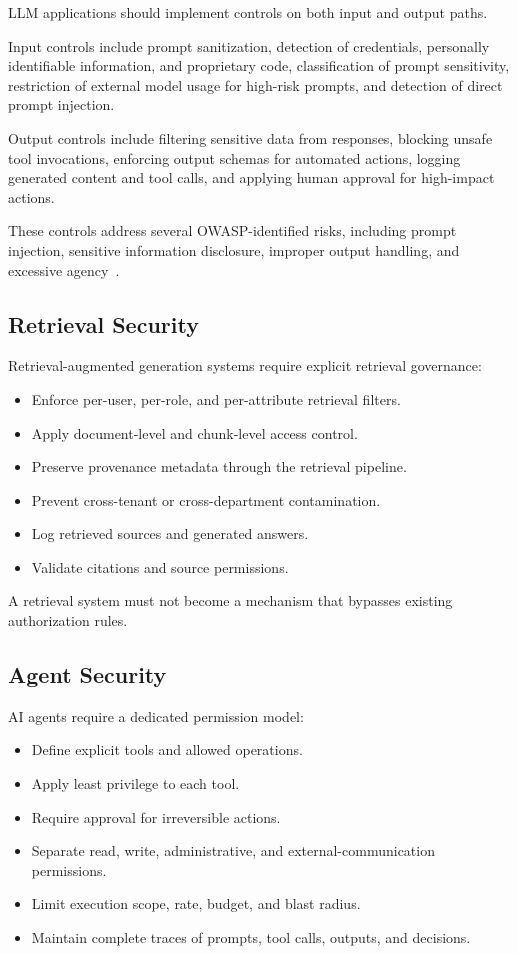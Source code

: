 \documentclass[conference]{IEEEtran}
\begin{document}
LLM applications should implement controls on both input and output paths.

Input controls include prompt sanitization, detection of credentials, personally identifiable information, and proprietary code, classification of prompt sensitivity, restriction of external model usage for high-risk prompts, and detection of direct prompt injection.

Output controls include filtering sensitive data from responses, blocking unsafe tool invocations, enforcing output schemas for automated actions, logging generated content and tool calls, and applying human approval for high-impact actions.

These controls address several OWASP-identified risks, including prompt injection, sensitive information disclosure, improper output handling, and excessive agency~\cite{owasp_llm_top10}.

\subsection{Retrieval Security}

Retrieval-augmented generation systems require explicit retrieval governance:

\begin{itemize}
  \item Enforce per-user, per-role, and per-attribute retrieval filters.
  \item Apply document-level and chunk-level access control.
  \item Preserve provenance metadata through the retrieval pipeline.
  \item Prevent cross-tenant or cross-department contamination.
  \item Log retrieved sources and generated answers.
  \item Validate citations and source permissions.
\end{itemize}

A retrieval system must not become a mechanism that bypasses existing authorization rules.

\subsection{Agent Security}

AI agents require a dedicated permission model:

\begin{itemize}
  \item Define explicit tools and allowed operations.
  \item Apply least privilege to each tool.
  \item Require approval for irreversible actions.
  \item Separate read, write, administrative, and external-communication permissions.
  \item Limit execution scope, rate, budget, and blast radius.
  \item Maintain complete traces of prompts, tool calls, outputs, and decisions.
\end{itemize}
\end{document}
